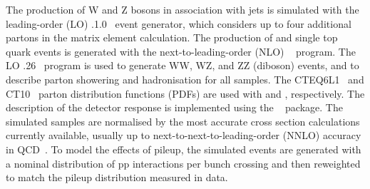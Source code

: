 The production of W and Z bosons in association with jets is simulated
with the leading-order (LO) .1.0~\cite{madgraph5} event
generator, which considers up to four additional partons in the matrix
element calculation. The production of \ttbar and single top quark
events is generated with the next-to-leading-order (NLO) ~\cite{powheg, Nason:2004rx, Alioli:2010xd, Frixione:2007nw}
program. The LO .26~\cite{pythia} program is used to
generate WW, WZ, and ZZ (diboson) events, and to describe parton
showering and hadronisation for all samples. The
{CTEQ6L1}~\cite{Pumplin:2002vw} and {CT10}~\cite{ct10} parton
distribution functions (PDFs) are used with \MADGRAPH and \POWHEG,
respectively. The description of the detector response is implemented
using the \GEANTfour~\cite{geant} package. The simulated samples are
normalised by the most accurate cross section calculations currently
available, usually up to next-to-next-to-leading-order (NNLO) accuracy
in QCD~\cite{xs-1, Gavin:2012sy, xs-2, xs-3, Czakon:2011xx}. To model
the effects of pileup, the simulated events are generated with a
nominal distribution of pp interactions per bunch crossing and then
reweighted to match the pileup distribution measured in data.

